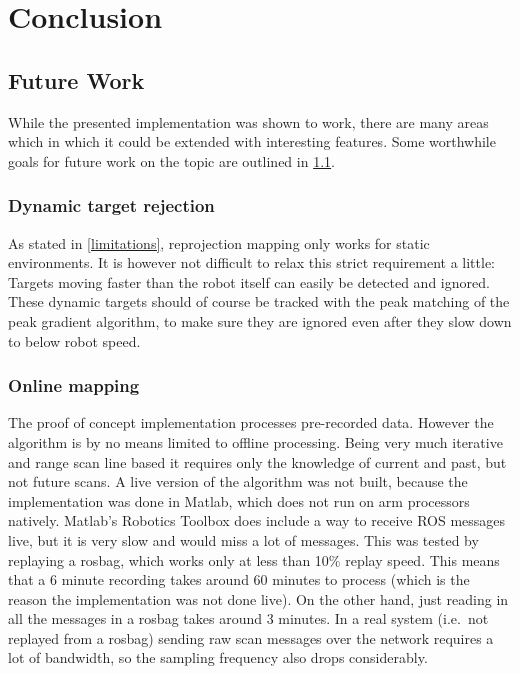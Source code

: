 \chapter{Conclusion}\label{conclusion}

\section{Future Work}\label{future-work}

While the presented implementation was shown to work, there are many areas which in which it could be extended with interesting features. Some worthwhile goals for future work on the topic are outlined in \cref{future-work}.

\subsection{Dynamic target rejection}\label{dynamic-target-rejection}

As stated in \cref{limitations}, reprojection mapping only works for static environments. It is however not difficult to relax this strict requirement a little: Targets moving faster than the robot itself can easily be detected and ignored. These dynamic targets should of course be tracked with the peak matching of the peak gradient algorithm, to make sure they are ignored even after they slow down to below robot speed.

\subsection{Online mapping}\label{online-mapping}

The proof of concept implementation processes pre-recorded data. However
the algorithm is by no means limited to offline processing. Being very
much iterative and range scan line based it requires only the knowledge
of current and past, but not future scans. A live version of the
algorithm was not built, because the implementation was done in Matlab,
which does not run on arm processors natively. Matlab's Robotics Toolbox
does include a way to receive ROS messages live, but it is very slow and
would miss a lot of messages. This was tested by replaying a rosbag,
which works only at less than 10\% replay speed. This means that a 6
minute recording takes around 60 minutes to process (which is the reason the implementation was not done live). On the other hand, just reading in all the messages in a rosbag takes around 3 minutes. In a real system (i.e.~not replayed from a rosbag) sending raw scan messages over the network requires a lot of bandwidth, so the sampling frequency also drops considerably.

